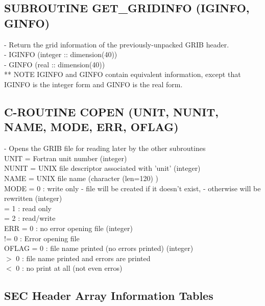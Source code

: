 \subsection{ SUBROUTINE GET\_GRIDINFO (IGINFO, GINFO) }

      - Return the grid information of the previously-unpacked GRIB header.\\
      - IGINFO (integer :: dimension(40))\\
      - GINFO (real :: dimension(40))\\
** NOTE  IGINFO and GINFO contain equivalent information, except that IGINFO is the integer form and GINFO is the real form.\\
 
\subsection{C-ROUTINE  COPEN (UNIT, NUNIT, NAME, MODE, ERR, OFLAG)}

      - Opens the GRIB file for reading later by the other subroutines \\

  	UNIT    = Fortran unit number  (integer) \\
    	
	NUNIT = UNIX file descriptor associated with 'unit' (integer) \\
 
 	NAME  = UNIX file name (character (len=120) )\\

  	MODE  = 0 : write only - file will be created if it doesn't exist, 
                           - otherwise will be rewritten (integer)\\
       		  = 1 : read only\\
         		  = 2 : read/write\\

	 ERR    = 0 : no error opening file  (integer)\\
       	       != 0 : Error opening file\\
         
	 OFLAG = 0 : file name printed (no errors printed) (integer)\\
          		  $>$ 0 : file name printed and errors are printed\\
          		  $<$ 0 : no print at all (not even erros) \\

\subsection{SEC Header Array Information Tables}\label{grid_desc}

